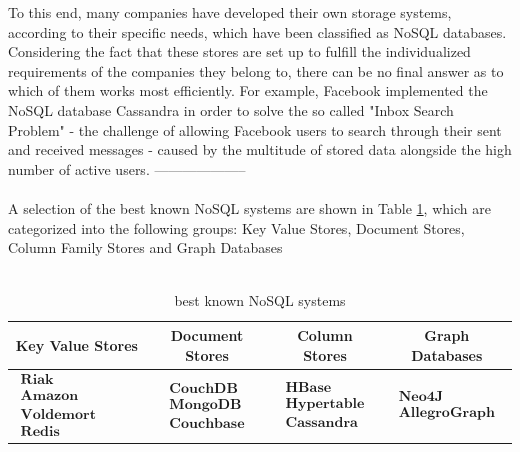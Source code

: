 To this end, many companies have developed their own storage systems, according to their specific needs, which have been classified as NoSQL databases. Considering the fact that these stores are set up to fulfill the individualized requirements of the companies they belong to, there can be no final answer as to which of them  works most efficiently. For example, Facebook implemented the NoSQL database Cassandra in order to solve the so called "Inbox Search Problem" - the challenge of allowing Facebook users to search through their sent and received messages - caused by the multitude of stored data alongside the high number of active users. 
--------------------
\\
\\
A selection of the best known NoSQL systems are shown in Table \ref{tbl:nosql_sys}, which are categorized into the following groups: Key Value Stores, Document Stores, Column Family Stores and  Graph Databases
\\
\\
\begin{table}[htb]
\begin{tabular}{|c|c|c|c|}
\hline 
\textbf{Key Value Stores} & \textbf{Document Stores} & \textbf{Column Stores} & \textbf{Graph Databases} \\ 
\hline 
$\begin{array}{l} \textbf{Riak} \\ \textbf{Amazon SimpleDB} \\ \textbf{Voldemort}\\  \textbf{Redis} \end{array}$ & 
$\begin{array}{l} \textbf{CouchDB} \\ \textbf{MongoDB} \\ \textbf{Couchbase} \end{array}$ & 
$\begin{array}{l} \textbf{HBase} \\ \textbf{Hypertable} \\ \textbf{Cassandra}  \end{array}$  & 
$\begin{array}{l} \textbf{Neo4J} \\ \textbf{AllegroGraph}   \end{array}$ \\ 
\hline 
\end{tabular}
\caption{best known NoSQL systems}
\label{tbl:nosql_sys}
\end{table}
\\
\\

